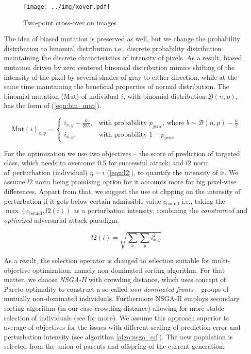 \begin{figure}
    \centering
    \texttt{[image: ../img/xover.pdf]}
    \caption{Two-point cross-over on images}
    \label{fig:xover}
\end{figure}

The idea of biased mutation is preserved as well, but we change the probability distribution to binomial distribution i.e., discrete probability distribution maintaining the discrete characteristics of intensity of pixels. As a result, biased mutation driven by zero centered binomial distribution mimics shifting of the intensity of the pixel by several shades of gray to either direction, while at the same time maintaining the beneficial properties of normal distribution. The binomial mutation (Mut) of individual $i$, with binomial distribution $\mathcal{B}(n, p)$, has the form of (\ref{eqn:bin_mut}).

\begin{equation} \label{eqn:bin_mut}
\text{Mut}(i)_{x,y} =
\begin{cases}
    i_{x, y} + \frac{b}{255}, & \text{with probability } p_{gene} \text{, where } b \sim \mathcal{B}(n, p) - \frac{n}{2}\\
    i_{x, y}, & \text{with probability } 1 - p_{gene}
\end{cases}
\end{equation}

For the optimization we use two objectives -- the score of prediction of targeted class, which needs to overcome 0.5 for successful attack; and $l2$ norm of~perturbation (individual) $\eta = i$ (\ref{eqn:l2}), to quantify the intensity of it. We assume $l2$ norm being promising option for it accounts more for big pixel-wise differences. Appart from that, we suggest the use of clipping on the intensity of perturbation if it gets below certain admissible value $c_\text{bound}$ i.e., taking the $\max(c_\text{bound}, l2(i))$ as a perturbation intensity, combining the \emph{constrained} and \emph{optimized} adversarial attack paradigm.

\begin{equation} \label{eqn:l2}
l2(i) = \sqrt{\sum\limits_x\sum\limits_y i_{x, y}^2}
\end{equation}

As a result, the selection operator is changed to selection suitable for multi-objective optimization, namely non-dominated sorting algorithm. For that matter, we choose \emph{NSGA-II} with crowding distance, which uses concept of Pareto-optimality to construct a so called \emph{non-dominated fronts} -- groups of mutually non-dominated individuals. Furthermore NSGA-II employs secondary sorting algorithm (in our case crowding distance) allowing for more stable selection of individuals (see \cite{nsga} for more). We assume this approach superior to average of objectives for the issues with different scaling of prediction error and perturbation intensity (see algorithm \ref{algo:nsga_cd}). The new population is selected from the union of parents and offspring of the current generation.

